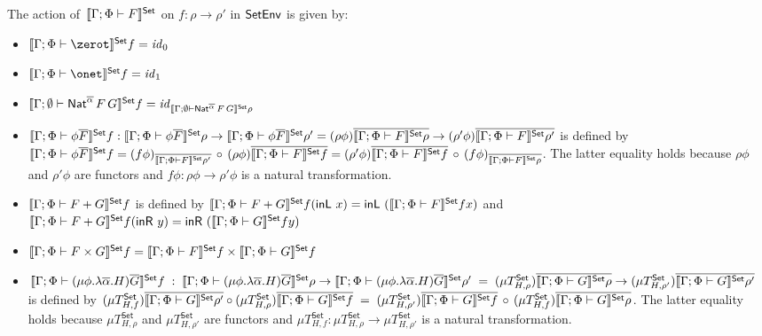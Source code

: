 \documentclass[runningheads]{llncs}
\newcommand{\set}{\mathsf{Set}}
\renewcommand{\id}{\mathit{id}}
\renewcommand{\id}{\mathit{id}}
\newcommand{\inl}{\mathsf{inL}\,}
\newcommand{\inr}{\mathsf{inR}\,}
\begin{document}
\begin{definition}\label{def:set-sem-funcs}
The action
of\, $\setsem{\Gamma;\Phi \vdash F}$
on
$f : \rho \to \rho'$ in $\mathsf{SetEnv}$ is given by:
\begin{itemize}
\item
 $\setsem{\Gamma;\Phi \vdash \zerot}f = \id_0$
\item
  $\setsem{\Gamma;\Phi \vdash \onet}f = \id_1$
\item 
  $\setsem{\Gamma; \emptyset
    \vdash \Nat^{\ol{\alpha}}\,F\,G} f =
  \id_{\setsem{\Gamma; \emptyset
      \vdash \Nat^{\ol{\alpha}}\,F\,G}\rho}$
\item 
$\setsem{\Gamma;\Phi \vdash \phi \ol{F}} f : \setsem{\Gamma;\Phi
  \vdash \phi \ol{F}}\rho \to \setsem{\Gamma;\Phi \vdash
  \phi\ol{F}}\rho' = (\rho\phi) \ol{\setsem{\Gamma;\Phi \vdash F}\rho}
  \to (\rho'\phi) \ol{\setsem{\Gamma;\Phi \vdash F}\rho'}$ is defined
  by $\setsem{\Gamma;\Phi \vdash \phi \ol{F}} f =
  (f\phi)_{\ol{\setsem{\Gamma;\Phi \vdash F}\rho'}}\, \circ\,
  (\rho\phi) {\ol{\setsem{\Gamma;\Phi \vdash F}f}} = (\rho'\phi)
  {\ol{\setsem{\Gamma;\Phi \vdash F}f}}\, \circ\, (f
  \phi)_{\ol{\setsem{\Gamma;\Phi \vdash F}\rho}}$.  The latter
  equality holds because $\rho\phi$ and $\rho'\phi$ are functors and
  $f\phi : \rho\phi \to \rho'\phi$ is a natural transformation.
\item 
  $\setsem{\Gamma;\Phi
  \vdash F + G}f$ is defined by $\setsem{\Gamma;\Phi \vdash
  F + G}f(\inl\,x) = \inl\,(\setsem{\Gamma;\Phi \vdash
  F}f x)$ and $\setsem{\Gamma;\Phi \vdash F +
  G}f(\inr\,y) = \inr\,(\setsem{\Gamma;\Phi \vdash G}f y)$
\item 
  $\setsem{\Gamma;\Phi \vdash F \times G}f = 
  \setsem{\Gamma;\Phi \vdash F}f \times \setsem{\Gamma;\Phi \vdash
    G}f$
\item 
$\setsem{\Gamma;\Phi \vdash (\mu \phi.\lambda
  \ol{\alpha}. H)\ol{G}} f \;: \;\setsem{\Gamma;\Phi \vdash
  (\mu \phi.\lambda \ol{\alpha}. H)\ol{G}} \rho \to
  \setsem{\Gamma;\Phi \vdash (\mu
    \phi.\lambda\ol{\alpha}. H)\ol{G}} \rho' \;= \;(\mu
  T^\set_{H,\rho})\ol{\setsem{\Gamma;\Phi \vdash G}\rho} \to
  (\mu T^\set_{H,\rho'})\ol{\setsem{\Gamma;\Phi \vdash
      G}\rho'}$ is defined by $(\mu
  T^\set_{H,f})\ol{\setsem{\Gamma;\Phi \vdash G}\rho'} \circ
  (\mu T^\set_{H,\rho})\ol{\setsem{\Gamma;\Phi \vdash G}f}\;
  = \; (\mu T^\set_{H,\rho'})\ol{\setsem{\Gamma;\Phi \vdash
      G}f}\, \circ\, (\mu
  T^\set_{H,f})\ol{\setsem{\Gamma;\Phi \vdash G}\rho}$.  The
  latter equality holds because $\mu T^\set_{H,\rho}$ and $\mu
  T^\set_{H,\rho'}$ are functors and $\mu T_{H,f}^\set : \mu
  T_{H,\rho}^\set \to \mu T_{H,\rho'}^\set$ is a natural
  transformation.
\end{itemize}
\end{definition}
\end{document}

